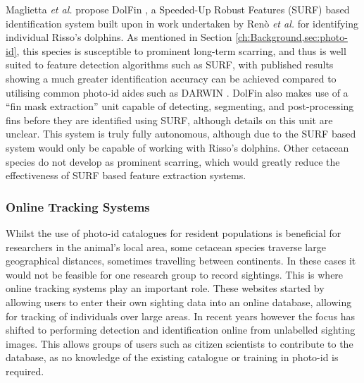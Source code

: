 Maglietta \textit{et al.} propose DolFin \cite{maglietta_dolfin_2018}, a Speeded-Up Robust Features (SURF) based identification system \cite{bay_speeded-up_2008} built upon in work undertaken by Renò \textit{et al.} \cite{reno_sift-based_2019} for identifying individual Risso's dolphins. As mentioned in Section \ref{ch:Background,sec:photo-id}, this species is susceptible to prominent long-term scarring, and thus is well suited to feature detection algorithms such as SURF, with published results showing a much greater identification accuracy can be achieved compared to utilising common photo-id aides such as DARWIN \cite{hale_unsupervised_2012}. DolFin also makes use of a ``fin mask extraction'' unit capable of detecting, segmenting, and post-processing fins before they are identified using SURF, although details on this unit are unclear. This system is truly fully autonomous, although due to the SURF based system would only be capable of working with Risso's dolphins. Other cetacean species do not develop as prominent scarring, which would greatly reduce the effectiveness of SURF based feature extraction systems. 

\subsubsection{Online Tracking Systems}\label{ch:Background,sec:conTech,sub:photoIDAides,subsub:OnlineTracking}

Whilst the use of photo-id catalogues for resident populations is beneficial for researchers in the animal's local area, some cetacean species traverse large geographical distances, sometimes travelling between continents. In these cases it would not be feasible for one research group to record sightings. This is where online tracking systems play an important role. These websites started by allowing users to enter their own sighting data into an online database, allowing for tracking of individuals over large areas. In recent years however the focus has shifted to performing detection and identification online from unlabelled sighting images. This allows groups of users such as citizen scientists to contribute to the database, as no knowledge of the existing catalogue or training in photo-id is required.

